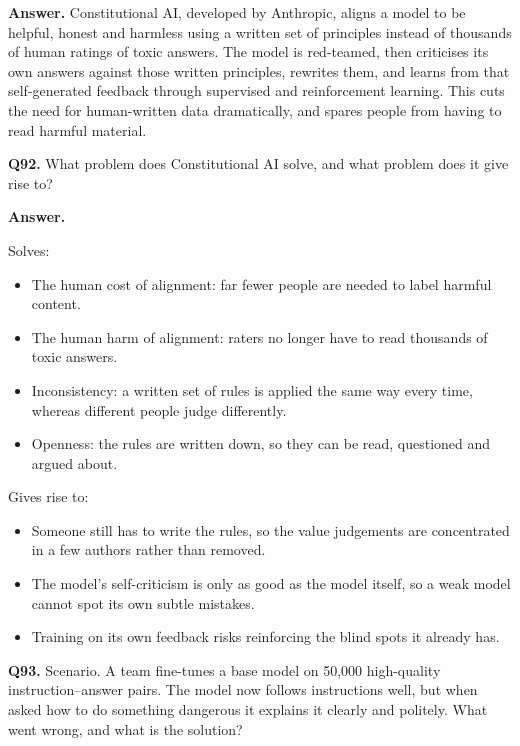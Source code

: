 \documentclass[11pt]{article}
\begin{document}
\textbf{Answer.} Constitutional AI, developed by Anthropic, aligns a model to be helpful,
honest and harmless using a written set of principles instead of thousands of human ratings of
toxic answers. The model is red-teamed, then criticises its own answers against those written
principles, rewrites them, and learns from that self-generated feedback through supervised and
reinforcement learning. This cuts the need for human-written data dramatically, and spares
people from having to read harmful material.

\medskip
\textbf{Q92.} What problem does Constitutional AI solve, and what problem does it give rise
to?

\textbf{Answer.}

Solves:
\begin{itemize}
  \item The human cost of alignment: far fewer people are needed to label harmful content.
  \item The human harm of alignment: raters no longer have to read thousands of toxic answers.
  \item Inconsistency: a written set of rules is applied the same way every time, whereas different people judge differently.
  \item Openness: the rules are written down, so they can be read, questioned and argued about.
\end{itemize}

Gives rise to:
\begin{itemize}
  \item Someone still has to write the rules, so the value judgements are concentrated in a few authors rather than removed.
  \item The model's self-criticism is only as good as the model itself, so a weak model cannot spot its own subtle mistakes.
  \item Training on its own feedback risks reinforcing the blind spots it already has.
\end{itemize}

\medskip
\textbf{Q93.} Scenario. A team fine-tunes a base model on 50{,}000 high-quality
instruction--answer pairs. The model now follows instructions well, but when asked how to do
something dangerous it explains it clearly and politely. What went wrong, and what is the
solution?
\end{document}
